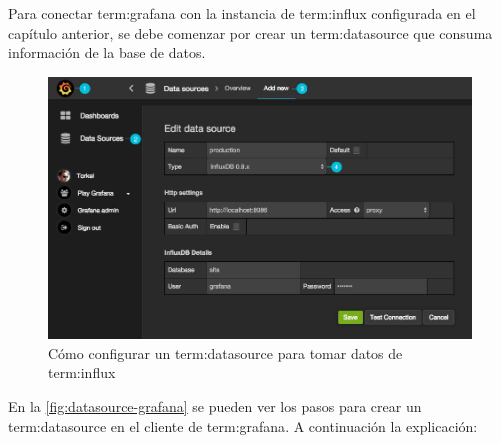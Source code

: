 Para conectar \gls{term:grafana} con la instancia de \gls{term:influx}
configurada en el capítulo anterior, se debe comenzar por crear un \gls{term:datasource}
que consuma información de la base de datos.

\begin{figure}
  \includegraphics[width=\linewidth]{src/images/05-capitulo-5/datasource-grafana.jpg}
  \caption{Cómo configurar un \gls{term:datasource} para tomar datos de \gls{term:influx}}
  \label{fig:datasource-grafana}
\end{figure}

En la \autoref{fig:datasource-grafana} se pueden ver los pasos para crear un
\gls{term:datasource} en el cliente  de \gls{term:grafana}. A
continuación la explicación:

